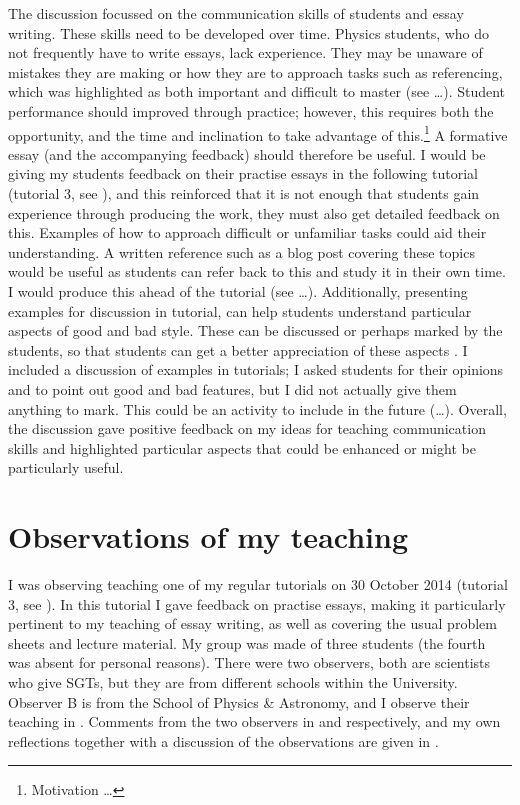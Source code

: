 The discussion focussed on the communication skills of students and essay writing. These skills need to be developed over time. Physics students, who do not frequently have to write essays, lack experience. They may be unaware of mistakes they are making or how they are to approach tasks such as referencing, which was highlighted as both important and difficult to master (see \ldots). Student performance should improved through practice; however, this requires both the opportunity, and the time and inclination to take advantage of this.\footnote{Motivation \ldots} A formative essay (and the accompanying feedback) should therefore be useful. I would be giving my students feedback on their practise essays in the following tutorial (tutorial 3, see ), and this reinforced that it is not enough that students gain experience through producing the work, they must also get detailed feedback on this. Examples of how to approach difficult or unfamiliar tasks could aid their understanding. A written reference such as a blog post covering these topics would be useful as students can refer back to this and study it in their own time. I would produce this ahead of the tutorial (see \ldots). Additionally, presenting examples for discussion in tutorial, can help students understand particular aspects of good and bad style. These can be discussed or perhaps marked by the students, so that students can get a better appreciation of these aspects \citep[chapter 10]{Ramsden1992}. I included a discussion of examples in tutorials; I asked students for their opinions and to point out good and bad features, but I did not actually give them anything to mark. This could be an activity to include in the future (\ldots). Overall, the discussion gave positive feedback on my ideas for teaching communication skills and highlighted particular aspects that could be enhanced or might be particularly useful.


\section{Observations of my teaching}\label{sec:me}

I was observing teaching one of my regular tutorials on 30 October 2014 (tutorial 3, see ). In this tutorial I gave feedback on practise essays, making it particularly pertinent to my teaching of essay writing, as well as covering the usual problem sheets and lecture material. My group was made of three students (the fourth was absent for personal reasons). There were two observers, both are scientists who give SGTs, but they are from different schools within the University. Observer B is from the School of Physics \& Astronomy, and I observe their teaching in . Comments from the two observers in  and  respectively, and my own reflections together with a discussion of the observations are given in .


